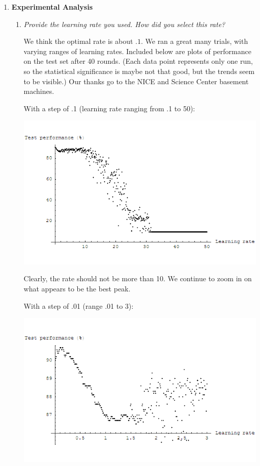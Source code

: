 \documentclass{article}
\begin{document}
\begin{enumerate}
  \item \textbf{Experimental Analysis}
    \begin{enumerate}
    \item \textit{Provide the learning rate you used. How did you
      select this rate?}

      We think the optimal rate is about $.1$. We ran a great many
      trials, with varying ranges of learning rates. Included below
      are plots of performance on the test set after 40 rounds. (Each
      data point represents only one run, so the statistical
      significance is maybe not that good, but the trends seem to be
      visible.) Our thanks go to the NICE and Science Center basement
      machines.


      With a step of .1 (learning rate ranging from .1 to 50):

      \begin{center}
        \includegraphics[scale=.5]{plot_test_1.png}
      \end{center}

      Clearly, the rate should not be more than 10. We continue to
      zoom in on what appears to be the best peak.

      With a step of .01 (range .01 to 3):

      \begin{center}
        \includegraphics[scale=.5]{plot_test_01.png}
      \end{center}


\end{enumerate}
\end{enumerate}
\end{document}
